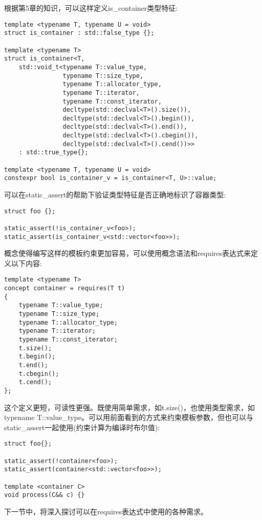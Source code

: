 根据第5章的知识，可以这样定义is\_container类型特征:

\begin{lstlisting}[style=styleCXX]
template <typename T, typename U = void>
struct is_container : std::false_type {};

template <typename T>
struct is_container<T,
	std::void_t<typename T::value_type,
				typename T::size_type,
				typename T::allocator_type,
				typename T::iterator,
				typename T::const_iterator,
				decltype(std::declval<T>().size()),
				decltype(std::declval<T>().begin()),
				decltype(std::declval<T>().end()),
				decltype(std::declval<T>().cbegin()),
				decltype(std::declval<T>().cend())>>
	: std::true_type{};

template <typename T, typename U = void>
constexpr bool is_container_v = is_container<T, U>::value;
\end{lstlisting}

可以在static\_assert的帮助下验证类型特征是否正确地标识了容器类型:

\begin{lstlisting}[style=styleCXX]
struct foo {};

static_assert(!is_container_v<foo>);
static_assert(is_container_v<std::vector<foo>>);
\end{lstlisting}

概念使得编写这样的模板约束更加容易，可以使用概念语法和requires表达式来定义以下内容:

\begin{lstlisting}[style=styleCXX]
template <typename T>
concept container = requires(T t)
{
	typename T::value_type;
	typename T::size_type;
	typename T::allocator_type;
	typename T::iterator;
	typename T::const_iterator;
	t.size();
	t.begin();
	t.end();
	t.cbegin();
	t.cend();
};
\end{lstlisting}

这个定义更短，可读性更强。既使用简单需求，如t.size()，也使用类型需求，如typename T::value\_type。可以用前面看到的方式来约束模板参数，但也可以与static\_assert一起使用(约束计算为编译时布尔值):

\begin{lstlisting}[style=styleCXX]
struct foo{};

static_assert(!container<foo>);
static_assert(container<std::vector<foo>>);

template <container C>
void process(C&& c) {}
\end{lstlisting}

下一节中，将深入探讨可以在requires表达式中使用的各种需求。


























